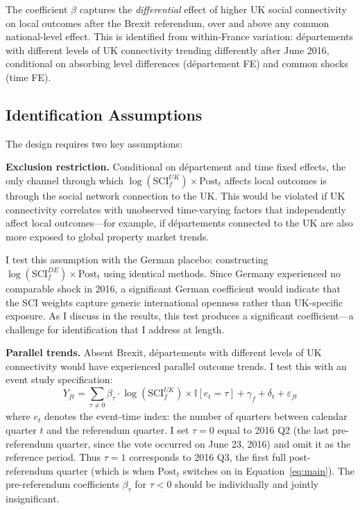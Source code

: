 \documentclass[12pt]{article}
\newcommand{\ind}{\mathbb{I}}
\begin{document}
The coefficient $\beta$ captures the \textit{differential} effect of higher UK social connectivity on local outcomes after the Brexit referendum, over and above any common national-level effect. This is identified from within-France variation: d\'epartements with different levels of UK connectivity trending differently after June 2016, conditional on absorbing level differences (d\'epartement FE) and common shocks (time FE).

\subsection{Identification Assumptions}

The design requires two key assumptions:

\textbf{Exclusion restriction.} Conditional on d\'epartement and time fixed effects, the only channel through which $\log(\text{SCI}_f^{UK}) \times \text{Post}_t$ affects local outcomes is through the social network connection to the UK. This would be violated if UK connectivity correlates with unobserved time-varying factors that independently affect local outcomes---for example, if d\'epartements connected to the UK are also more exposed to global property market trends.

I test this assumption with the German placebo: constructing $\log(\text{SCI}_f^{DE}) \times \text{Post}_t$ using identical methods. Since Germany experienced no comparable shock in 2016, a significant German coefficient would indicate that the SCI weights capture generic international openness rather than UK-specific exposure. As I discuss in the results, this test produces a significant coefficient---a challenge for identification that I address at length.

\textbf{Parallel trends.} Absent Brexit, d\'epartements with different levels of UK connectivity would have experienced parallel outcome trends. I test this with an event study specification:
\begin{equation}
Y_{ft} = \sum_{\tau \neq 0} \beta_\tau \cdot \log(\text{SCI}_f^{UK}) \times \ind[e_t = \tau] + \gamma_f + \delta_t + \varepsilon_{ft}
\label{eq:event_study}
\end{equation}
where $e_t$ denotes the event-time index: the number of quarters between calendar quarter $t$ and the referendum quarter. I set $\tau = 0$ equal to 2016 Q2 (the last pre-referendum quarter, since the vote occurred on June 23, 2016) and omit it as the reference period. Thus $\tau = 1$ corresponds to 2016 Q3, the first full post-referendum quarter (which is when $\text{Post}_t$ switches on in Equation~\ref{eq:main}). The pre-referendum coefficients $\beta_\tau$ for $\tau < 0$ should be individually and jointly insignificant.
\end{document}
